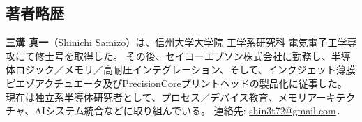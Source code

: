 \documentclass[conference]{IEEEtran}
\begin{document}
\begin{CJK}{UTF8}{min}
\section*{著者略歴}
\textbf{三溝 真一}（Shinichi Samizo）は、信州大学大学院 工学系研究科 電気電子工学専攻にて修士号を取得した。  
その後、セイコーエプソン株式会社に勤務し、半導体ロジック／メモリ／高耐圧インテグレーション、そして、インクジェット薄膜ピエゾアクチュエータ及びPrecisionCoreプリントヘッドの製品化に従事した。  
現在は独立系半導体研究者として、プロセス／デバイス教育、メモリアーキテクチャ、AIシステム統合などに取り組んでいる。  
連絡先: \href{mailto:shin3t72@gmail.com}{shin3t72@gmail.com}．

\end{CJK}
\end{document}
